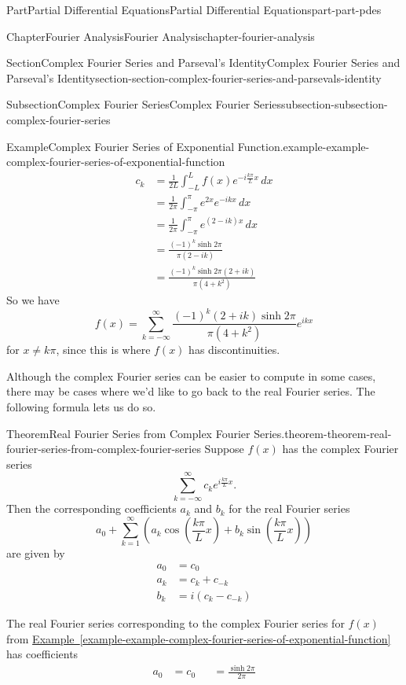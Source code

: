 \documentclass[twoside,10pt,]{book}
\newcommand{\xreffont}{\relax}
\numberwithin{equation}{part}
\newcommand{\amp}{&}
\begin{document}
\begin{partptx}{Part}{Partial Differential Equations}{}{Partial Differential Equations}{}{}{part-part-pdes}
\begin{chapterptx}{Chapter}{Fourier Analysis}{}{Fourier Analysis}{}{}{chapter-fourier-analysis}
\begin{sectionptx}{Section}{Complex Fourier Series and Parseval's Identity}{}{Complex Fourier Series and Parseval's Identity}{}{}{section-section-complex-fourier-series-and-parsevals-identity}
\begin{subsectionptx}{Subsection}{Complex Fourier Series}{}{Complex Fourier Series}{}{}{subsection-subsection-complex-fourier-series}
\begin{example}{Example}{Complex Fourier Series of Exponential Function.}{example-example-complex-fourier-series-of-exponential-function}
\begin{align*}
c_{k} \amp = \frac{1}{2L}\int_{-L}^{L}f(x)e^{-i\frac{k\pi}{L}x}\,dx\\
\amp = \frac{1}{2\pi}\int_{-\pi}^{\pi}e^{2x}e^{-ikx}\,dx \\
\amp = \frac{1}{2\pi}\int_{-\pi}^{\pi}e^{(2-ik)x}\,dx \\
\amp = \frac{(-1)^{k}\sinh2\pi}{\pi(2-ik)} \\
\amp = \frac{(-1)^{k}\sinh2\pi(2+ik)}{\pi(4+k^{2})}
\end{align*}
So we have%
\begin{equation*}
f(x) = \sum_{k=-\infty}^{\infty}\frac{(-1)^{k}(2+ik)\sinh2\pi}{\pi(4+k^{2})}e^{ikx}
\end{equation*}
for \(x\neq k\pi\), since this is where \(f(x)\) has discontinuities.%
\end{example}
Although the complex Fourier series can be easier to compute in some cases, there may be cases where we'd like to go back to the real Fourier series. The following formula lets us do so.%
\begin{theorem}{Theorem}{Real Fourier Series from Complex Fourier Series.}{}{theorem-theorem-real-fourier-series-from-complex-fourier-series}%
%
Suppose \(f(x)\) has the complex Fourier series%
\begin{equation*}
\sum_{k=-\infty}^{\infty}c_{k}e^{i\frac{k\pi}{L}x}.
\end{equation*}
Then the corresponding coefficients \(a_{k}\) and \(b_{k}\) for the real Fourier series%
\begin{equation*}
a_{0} + \sum_{k=1}^{\infty}\left(a_{k}\cos\left(\frac{k\pi}{L}x\right)+b_{k}\sin\left(\frac{k\pi}{L}x\right)\right)
\end{equation*}
are given by%
\begin{align*}
a_{0} \amp = c_{0} \\
a_{k} \amp = c_{k} + c_{-k} \\
b_{k} \amp = i(c_{k}-c_{-k}) 
\end{align*}
%
\end{theorem}
The real Fourier series corresponding to the complex Fourier series for \(f(x)\) from \hyperref[example-example-complex-fourier-series-of-exponential-function]{Example~{\xreffont\ref{example-example-complex-fourier-series-of-exponential-function}}} has coefficients%
\begin{align*}
a_{0} \amp = c_{0} \amp \amp= \frac{\sinh2\pi}{2\pi} \\

\end{align*}
\end{subsectionptx}
\end{sectionptx}
\end{chapterptx}
\end{partptx}
\end{document}
